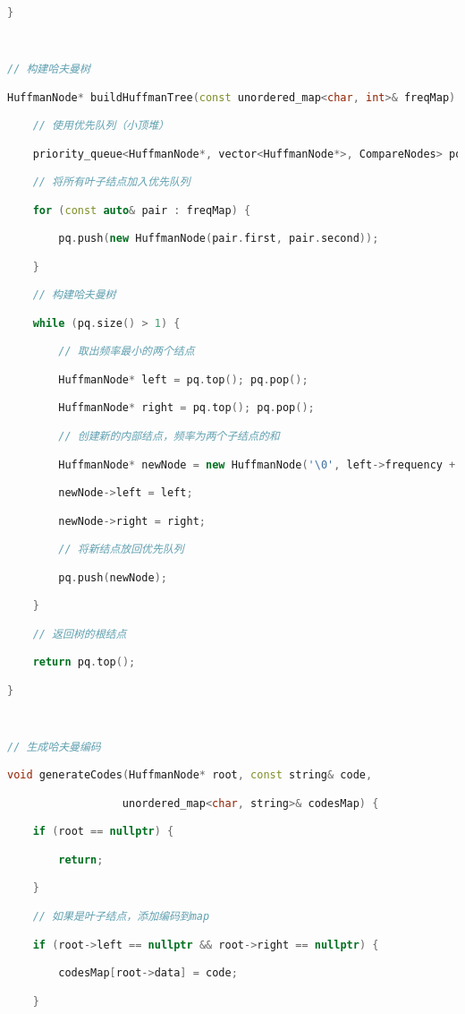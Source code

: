 \begin{lstlisting}[language=C++]
}

  

// 构建哈夫曼树

HuffmanNode* buildHuffmanTree(const unordered_map<char, int>& freqMap) {

    // 使用优先队列（小顶堆）

    priority_queue<HuffmanNode*, vector<HuffmanNode*>, CompareNodes> pq;

    // 将所有叶子结点加入优先队列

    for (const auto& pair : freqMap) {

        pq.push(new HuffmanNode(pair.first, pair.second));

    }

    // 构建哈夫曼树

    while (pq.size() > 1) {

        // 取出频率最小的两个结点

        HuffmanNode* left = pq.top(); pq.pop();

        HuffmanNode* right = pq.top(); pq.pop();

        // 创建新的内部结点，频率为两个子结点的和

        HuffmanNode* newNode = new HuffmanNode('\0', left->frequency + right->frequency);

        newNode->left = left;

        newNode->right = right;

        // 将新结点放回优先队列

        pq.push(newNode);

    }

    // 返回树的根结点

    return pq.top();

}

  

// 生成哈夫曼编码

void generateCodes(HuffmanNode* root, const string& code,

                  unordered_map<char, string>& codesMap) {

    if (root == nullptr) {

        return;

    }

    // 如果是叶子结点，添加编码到map

    if (root->left == nullptr && root->right == nullptr) {

        codesMap[root->data] = code;

    }


\end{lstlisting}
